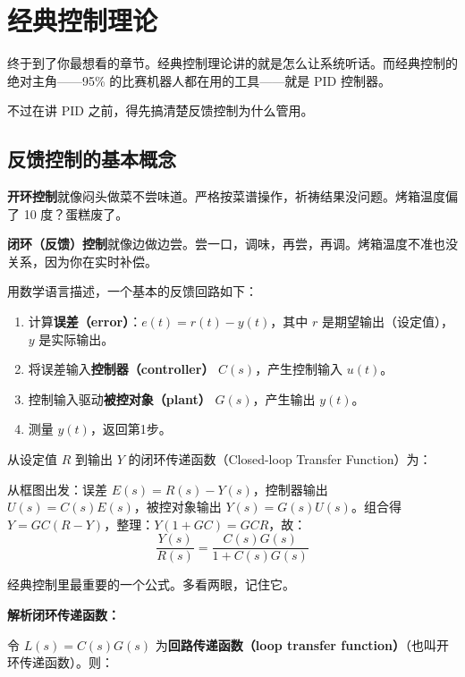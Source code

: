 \section{经典控制理论}

终于到了你最想看的章节。经典控制理论讲的就是怎么让系统听话。而经典控制的绝对主角——95\% 的比赛机器人都在用的工具——就是 PID 控制器。

不过在讲 PID 之前，得先搞清楚反馈控制为什么管用。

\subsection{反馈控制的基本概念}

\textbf{开环控制}就像闷头做菜不尝味道。严格按菜谱操作，祈祷结果没问题。烤箱温度偏了 10 度？蛋糕废了。

\textbf{闭环（反馈）控制}就像边做边尝。尝一口，调味，再尝，再调。烤箱温度不准也没关系，因为你在实时补偿。

用数学语言描述，一个基本的反馈回路如下：

\begin{enumerate}
    \item 计算\textbf{误差（error）}：$e(t) = r(t) - y(t)$，其中 $r$ 是期望输出（设定值），$y$ 是实际输出。
    \item 将误差输入\textbf{控制器（controller）} $C(s)$，产生控制输入 $u(t)$。
    \item 控制输入驱动\textbf{被控对象（plant）} $G(s)$，产生输出 $y(t)$。
    \item 测量 $y(t)$，返回第1步。
\end{enumerate}

从设定值 $R$ 到输出 $Y$ 的闭环传递函数（Closed-loop Transfer Function）为：

从框图出发：误差 $E(s) = R(s) - Y(s)$，控制器输出 $U(s) = C(s)E(s)$，被控对象输出 $Y(s) = G(s)U(s)$。组合得 $Y = GC(R - Y)$，整理：$Y(1 + GC) = GCR$，故：
\begin{equation}
\frac{Y(s)}{R(s)} = \frac{C(s)G(s)}{1 + C(s)G(s)}
\end{equation}

经典控制里最重要的一个公式。多看两眼，记住它。

\textbf{解析闭环传递函数：}

令 $L(s) = C(s)G(s)$ 为\textbf{回路传递函数（loop transfer function）}（也叫开环传递函数）。则：

